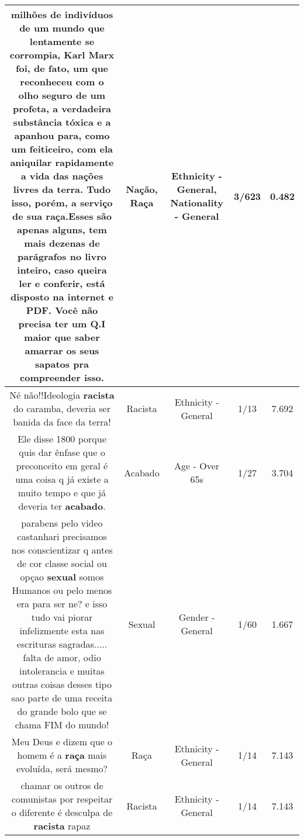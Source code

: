 \documentclass[11pt]{article}
\newlength\mylength
\begin{document}
\begin{center}
\begin{longtable}{|C{.65\mylength}|C{.30\mylength}|C{.12\mylength}|C{.12\mylength}|C{.12\mylength}|}
milhões de indivíduos de um mundo que lentamente se corrompia, Karl Marx foi, de fato, um que reconheceu com o olho seguro de um profeta, a verdadeira substância tóxica e a apanhou para, como um feiticeiro, com ela aniquilar rapidamente a vida das nações livres da terra. Tudo isso, porém, a serviço de sua \textbf{raça}.Esses são apenas alguns, tem mais dezenas de parágrafos no livro inteiro, caso queira ler e conferir, está disposto na internet e PDF. Você não precisa ter um Q.I maior que saber amarrar os seus sapatos pra compreender isso.\normalsize   & Nação, Raça & Ethnicity - General, Nationality - General & 3/623 & 0.482 \\  \hline
  \small Né não!!Ideologia \textbf{racista} do caramba, deveria ser banida da face da terra!\normalsize   & Racista & Ethnicity - General & 1/13 & 7.692 \\  \hline
  \small Ele disse 1800 porque quis dar ênfase que o preconceito em geral é uma coisa q já existe a muito tempo e que já deveria ter \textbf{acabado}.\normalsize   & Acabado & Age - Over 65s & 1/27 & 3.704 \\  \hline
  \small parabens  pelo video castanhari  precisamos nos conscientizar q antes de cor classe social ou opçao \textbf{sexual} somos Humanos ou pelo menos era para ser ne? e isso tudo vai piorar infelizmente esta nas escrituras sagradas..... falta de amor, odio intolerancia e muitas outras   coisas desses tipo sao parte de uma  receita  do grande bolo que se chama FIM do mundo!\normalsize   & Sexual & Gender - General & 1/60 & 1.667 \\  \hline
  \small Meu Deus e dizem que o homem é a \textbf{raça} mais evoluída, será mesmo?\normalsize   & Raça & Ethnicity - General & 1/14 & 7.143 \\  \hline
  \small chamar os outros de comunistas por respeitar o diferente é desculpa de \textbf{racista} rapaz\normalsize   & Racista & Ethnicity - General & 1/14 & 7.143 \\  \hline

\end{longtable}
\end{center}
\end{document}
